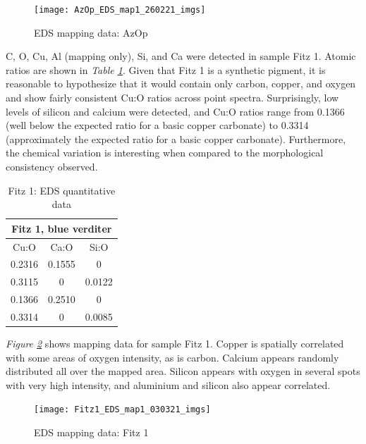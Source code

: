 \begin{figure}[H]
\centering
  \texttt{[image: AzOp\_EDS\_map1\_260221\_imgs]}
\caption[EDS mapping data: AzOp]{EDS mapping data: AzOp}
\label{fig:azop_map1}
\end{figure}


C, O, Cu, Al (mapping only), Si, and Ca were detected in sample Fitz 1. Atomic ratios are shown in \textit{Table \ref{table:fitz1_ratios}}. Given that Fitz 1 is a synthetic pigment, it is reasonable to hypothesize that it would contain only carbon, copper, and oxygen and show fairly consistent Cu:O ratios across point spectra. Surprisingly, low levels of silicon and calcium were detected, and Cu:O ratios range from 0.1366 (well below the expected ratio for a basic copper carbonate) to 0.3314 (approximately the expected ratio for a basic copper carbonate). Furthermore, the chemical variation is interesting when compared to the morphological consistency observed.

\begin{table}[H]
\caption{Fitz 1: EDS quantitative data}
\centering
\label{table:fitz1_ratios}
\begin{tabular}{c c c}
\toprule
\multicolumn{3}{c}{Fitz 1, blue verditer} \\
\midrule
Cu:O & Ca:O & Si:O \\
\midrule
0.2316 & 0.1555 & 0 \\
0.3115 & 0 & 0.0122 \\
0.1366 & 0.2510 & 0 \\
0.3314 & 0 & 0.0085 \\
\bottomrule
\end{tabular}
\end{table}

\textit{Figure \ref{fig:fitz1_map1}} shows mapping data for sample Fitz 1. Copper is spatially correlated with some areas of oxygen intensity, as is carbon. Calcium appears randomly distributed all over the mapped area. Silicon appears with oxygen in several spots with very high intensity, and aluminium and silicon also appear correlated.

\begin{figure}[H]
\centering
  \texttt{[image: Fitz1\_EDS\_map1\_030321\_imgs]}
\caption[EDS mapping data: Fitz 1]{EDS mapping data: Fitz 1}
\label{fig:fitz1_map1}
\end{figure}

